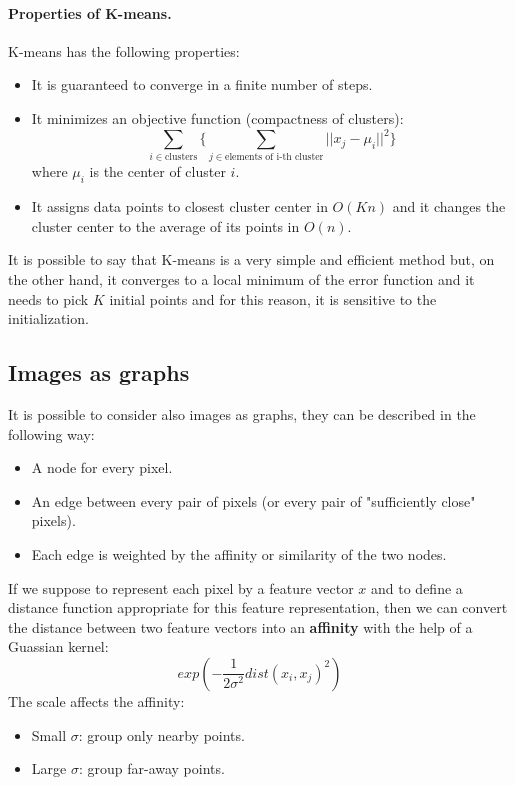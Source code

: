 \paragraph*{Properties of K-means.} K-means has the following properties:
\begin{itemize}
	\item It is guaranteed to converge in a finite number of steps.
	\item It minimizes an objective function (compactness of clusters):
	$$\sum_{i \in \text{clusters}} \Biggl\{ \sum_{j \in \text{elements of i-th cluster}} ||x_j - \mu_i||^2 \Biggr\}$$
	where $\mu_i$ is the center of cluster $i$.
	\item It assigns data points to closest cluster center in $O(Kn)$ and it changes the cluster center to the average of its points in $O(n)$.
\end{itemize}
It is possible to say that K-means is a very simple and efficient method but, on the other hand, it converges to a local minimum of the error function and it needs to pick $K$ initial points and for this reason, it is sensitive to the initialization.

\subsection{Images as graphs}
It is possible to consider also images as graphs, they can be described in the following way:
\begin{itemize}
	\item A node for every pixel.
	\item An edge between every pair of pixels (or every pair of "sufficiently close" pixels).
	\item Each edge is weighted by the affinity or similarity of the two nodes.
\end{itemize}  
If we suppose to represent each pixel by a feature vector $x$ and to define a distance function appropriate for this feature representation, then we can convert the distance between two feature vectors into an \textbf{affinity} with the help of a Guassian kernel:
$$exp\left(-\frac{1}{2\sigma^2} dist(x_i, x_j)^2\right)$$
The scale affects the affinity:
\begin{itemize}
	\item Small $\sigma$: group only nearby points.
	\item Large $\sigma$: group far-away points.
\end{itemize}

